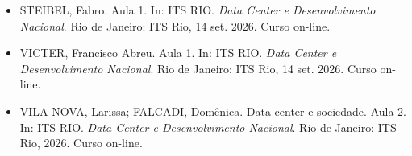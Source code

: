 \documentclass[11pt]{article}
\begin{document}
\begin{itemize}
        investimento inicial de R\$~3 bilhões. \emph{O Globo}, Rio de Janeiro, 11 set. 2024. Blog Capital.
  \item STEIBEL, Fabro. Aula 1. In: ITS RIO. \emph{Data Center e Desenvolvimento Nacional}. Rio de Janeiro: ITS Rio, 14 set. 2026. Curso on-line.
  \item VICTER, Francisco Abreu. Aula 1. In: ITS RIO. \emph{Data Center e Desenvolvimento Nacional}. Rio de Janeiro: ITS Rio, 14 set. 2026. Curso on-line.
  \item VILA NOVA, Larissa; FALCADI, Domênica. Data center e sociedade. Aula 2. In: ITS RIO. \emph{Data Center e Desenvolvimento Nacional}.
        Rio de Janeiro: ITS Rio, 2026. Curso on-line.
\end{itemize}
\end{document}
